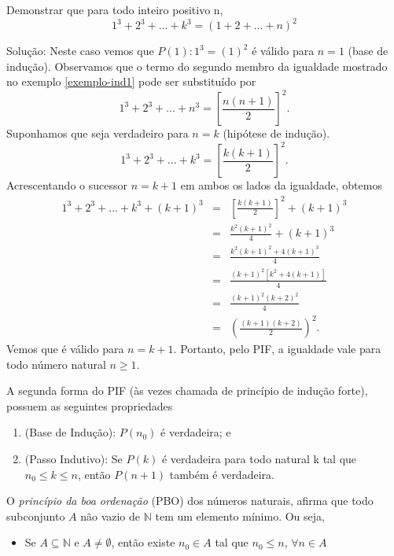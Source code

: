 \begin{exem}
	Demonstrar que para todo inteiro positivo n,
	\begin{equation*}
	1^3 + 2^3 + ... + k^3 = (1 + 2 + ... + n)^2
	\end{equation*}
\end{exem}
\noindent Solução: Neste caso vemos que $P(1): 1^3 = (1)^2$ é válido para $n = 1$ (base de indução). Observamos que o termo do segundo membro da igualdade mostrado no exemplo \ref{exemplo-ind1} pode ser substituído por
\begin{equation*}
	1^3 + 2^3 + ... + n^3 = \left[\frac{n(n+1)}{2}\right]^2.
\end{equation*}
\noindent Suponhamos que seja verdadeiro para $n = k$ (hipótese de indução).
\begin{equation*}
1^3 + 2^3 + ... + k^3 = \left[\frac{k(k+1)}{2}\right]^2.
\end{equation*}
\noindent Acrescentando o sucessor $n = k + 1$ em ambos os lados da igualdade, obtemos
\begin{eqnarray*}
	1^3 + 2^3 + ... + k^3 + (k+1)^3 &=& \left[\frac{k(k+1)}{2}\right]^2 + (k+1)^3\\
	&=& \frac{k^2(k+1)^2}{4} + (k+1)^3 \\
	&=& \frac{k^2(k+1)^2 + 4(k+1)^3}{4} \\
	&=& \frac{(k+1)^2[k^2 + 4(k+1)]}{4} \\
	&=& \frac{(k+1)^2(k+2)^2}{4} \\
	&=& \left(\frac{(k+1)(k+2)}{2} \right)^2.
\end{eqnarray*}
\noindent Vemos que é válido para $n = k + 1$. Portanto, pelo PIF, a igualdade vale para todo número natural $n \geq 1$.

A segunda forma do PIF (às vezes chamada de princípio de indução forte), possuem as seguintes propriedades 
\begin{enumerate}
	\item (Base de Indução): $P(n_0)$ é verdadeira; e
	\item (Passo Indutivo): Se $P(k)$ é verdadeira para todo natural k tal que $n_0 \leq k \leq n$, então $P(n+1)$ também é verdadeira.
\end{enumerate}









O \textit{princípio da boa ordenação} (PBO) dos números naturais, afirma que todo subconjunto $A$ não vazio de $\mathbb{N}$ tem um elemento mínimo. Ou seja,
\begin{itemize}
	\item Se $A \subseteq \mathbb{N}$ e $A \neq \emptyset$, então existe $n_0 \in A$ tal que $n_0 \leq n$, $\forall n \in A$
\end{itemize}

